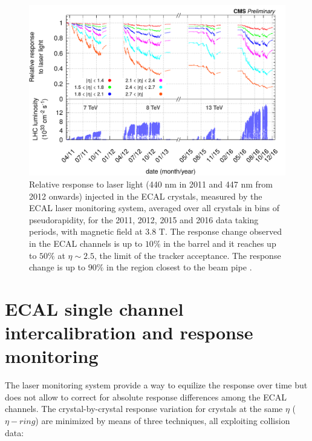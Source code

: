 \begin{figure}
  \centering
  \includegraphics[width = .9\textwidth]{figures/ecal/histories_2011-2012-2015-2016_161212.png}
  \caption{Relative response to laser light (440 nm in 2011 and 447 nm from
    2012 onwards) injected in the ECAL crystals, measured by the ECAL
    laser monitoring system, averaged over all crystals in bins of
    pseudorapidity, for the 2011, 2012, 2015 and 2016 data taking periods,
    with magnetic field at 3.8 T. The response change observed in the
    ECAL channels is up to $10\%$ in the barrel and it reaches up to $50\%$ at $\eta\sim 2.5$,
    the limit of the tracker acceptance. The response change is up to $90\%$ in the region closest to the beam pipe
    \cite{laser_and_phisym}.}
  \label{fig:laser}
\end{figure}

\section{ECAL single channel intercalibration and response monitoring}
\label{sec:minchia_la_calibrazione}

The laser monitoring system provide a way to equilize the response over time but does not allow to
correct for absolute response differences among the ECAL channels. The crystal-by-crystal response variation
for crystals at the same $\eta$ ($\eta-ring$) are minimized by means of three techniques, all exploiting collision data:

